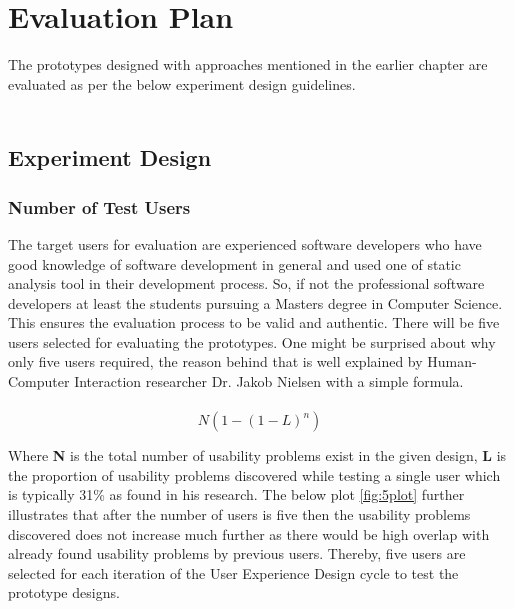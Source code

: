 \chapter{Evaluation Plan}
\label{ch:evaluationplan} 

The prototypes designed with approaches mentioned in the earlier chapter are evaluated as per the below experiment design guidelines. \\ \\

\section{Experiment Design}

\subsection{Number of Test Users}

The target users for evaluation are experienced software developers who have good knowledge of software development in general and used one of static analysis tool in their development process. So, if not the professional software developers at least the students pursuing a Masters degree in Computer Science. This ensures the evaluation process to be valid and authentic. There will be five users selected for evaluating the prototypes. One might be surprised about why only five users required, the reason behind that is well explained by Human-Computer Interaction researcher Dr. Jakob Nielsen with a simple formula\cite{five}. \\ \\

\[ N (1-(1- L )^n ) \]

Where \textbf{N} is the total number of usability problems exist in the given design, \textbf{L} is the proportion of usability problems discovered while testing a single user which is typically 31\% as found in his research. The below plot \ref{fig:5plot} further illustrates that after the number of users is five then the usability problems discovered does not increase much further as there would be high overlap with already found usability problems by previous users. Thereby, five users are selected for each iteration of the User Experience Design cycle to test the prototype designs. \\ \\

